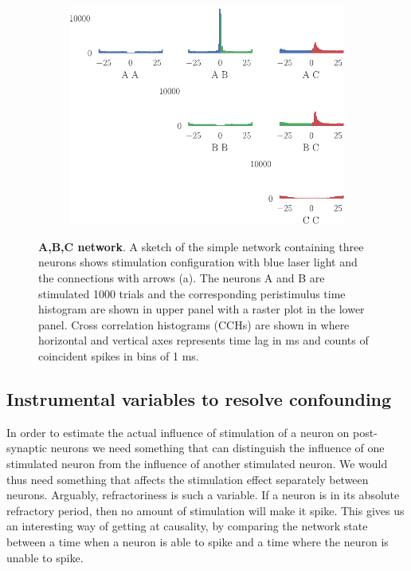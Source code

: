 \documentclass[11pt]{article}
\begin{document}
\begin{figure}
\medskip
\begin{subfigure}{\textwidth}\centering \includegraphics[scale=1]{xcorr}
\caption{} \label{fig:intro:3}
\end{subfigure}
\caption{{\bf A,B,C network}. A sketch of the simple network containing three neurons %
shows stimulation configuration with blue laser light and the connections with arrows (a). The neurons A and B are stimulated 1000 trials and the corresponding peristimulus time histogram are shown in  upper panel with a raster plot in the lower panel. Cross correlation histograms (CCHs) are shown in  where horizontal and vertical axes represents time lag in ms and counts of coincident spikes in bins of 1 ms. \label{fig:intro}}
\end{figure}
\FloatBarrier
\subsection{Instrumental variables to resolve confounding}
In order to estimate the actual influence of stimulation of a neuron on post-synaptic neurons we need something that can distinguish the influence of one stimulated neuron from the influence of another stimulated neuron. We would thus need something that affects the stimulation effect separately between neurons. Arguably, refractoriness is such a variable. If a neuron is in its absolute refractory period, then no amount of stimulation will make it spike. This gives us an interesting way of getting at causality, by comparing the network state between a time when a neuron is able to spike and a time where the neuron is unable to spike.
\end{document}
